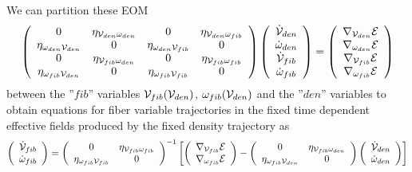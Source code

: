 We can partition these EOM 
\begin{equation}
\left( 
\begin{array}{cccc}
0 & \eta _{{\cal V}_{den}\omega _{den}} & 0 & \eta _{{\cal V}_{den}\omega
_{fib}} \\ 
\eta _{\omega _{den}{\cal V}_{den}} & 0 & \eta _{\omega _{den}{\cal V}_{fib}}
& 0 \\ 
0 & \eta _{{\cal V}_{fib}\omega _{den}} & 0 & \eta _{{\cal V}_{fib}\omega
_{fib}} \\ 
\eta _{\omega _{fib}{\cal V}_{den}} & 0 & \eta _{\omega _{fib}{\cal V}_{fib}}
& 0%
\end{array}%
\right) \left( 
\begin{array}{c}
{\cal \dot{V}}_{den} \\ 
\dot{\omega}_{den} \\ 
{\cal \dot{V}}_{fib} \\ 
\dot{\omega}_{fib}%
\end{array}%
\right) =\left( 
\begin{array}{c}
\nabla _{{\cal V}_{den}}{\cal E} \\ 
\nabla _{\omega _{den}}{\cal E} \\ 
\nabla _{{\cal V}_{fib}}{\cal E} \\ 
\nabla _{\omega _{fib}}{\cal E}%
\end{array}%
\right)
\end{equation}%
between the ''$fib$'' variables ${\cal V}_{fib}({\cal V}_{den})$, $\omega
_{fib}({\cal V}_{den})$ and the ''$den$'' variables to obtain equations for
fiber variable trajectories in the fixed time dependent effective fields
produced by the fixed density trajectory as 
\begin{equation}
\left( 
\begin{array}{c}
{\cal \dot{V}}_{fib} \\ 
\dot{\omega}_{fib}%
\end{array}%
\right) =\left( 
\begin{array}{cc}
0 & \eta _{{\cal V}_{fib}\omega _{fib}} \\ 
\eta _{\omega _{fib}{\cal V}_{fib}} & 0%
\end{array}%
\right) ^{-1}\left[ \left( 
\begin{array}{c}
\nabla _{{\cal V}_{fib}}{\cal E} \\ 
\nabla _{\omega _{fib}}{\cal E}%
\end{array}%
\right) -\left( 
\begin{array}{cc}
0 & \eta _{{\cal V}_{fib}{\cal \omega }_{den}} \\ 
\eta _{{\cal \omega }_{fib}{\cal V}_{den}} & 0%
\end{array}%
\right) \left( 
\begin{array}{c}
{\cal \dot{V}}_{den} \\ 
\dot{\omega}_{den}%
\end{array}%
\right) \right]
\end{equation}%
